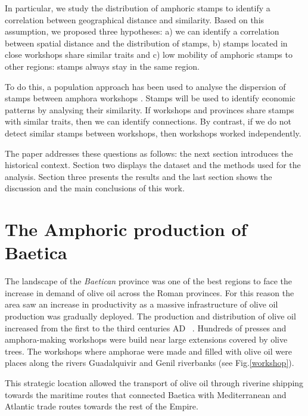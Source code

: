 \documentclass[review]{elsarticle}
\begin{document}
In particular, we study the distribution of amphoric stamps to identify a correlation between geographical distance and similarity. Based on this assumption, we proposed three hypotheses: a) we can identify a correlation between spatial distance and the distribution of stamps, b) stamps located in close workshops share similar traits and c) low mobility of amphoric stamps to other regions: stamps always stay in the same region.  

To do this, a population approach has been used to analyse the dispersion of stamps between amphora workshops \citep{rubio-campillo_ecology_2018}. Stamps will be used to identify economic patterns by analysing their similarity. If workshops and provinces share stamps with similar traits, then we can identify connections. By contrast, if we do not detect similar stamps between workshops, then workshops worked independently. 

The paper addresses these questions as follows: the next section introduces the historical context. Section two displays the dataset and the methods used for the analysis. Section three presents the results and the last section shows the discussion and the main conclusions of this work. 


\section{The Amphoric production of Baetica}

The landscape of the \textit{Baetican} province was one of the best regions to face the increase in demand of olive oil across the Roman provinces. For this reason the area saw an increase in productivity as a massive infrastructure of olive oil production was gradually deployed. The production and distribution of olive oil increased from the first to the third centuries AD ~\citep{remesal_concierto}. Hundreds of presses and amphora-making workshops were build near large extensions covered by olive trees. The workshops where amphorae were made and filled with olive oil were places along the rivers Guadalquivir and Genil riverbanks (see Fig.\ref{workshop}).

This strategic location allowed the transport of olive oil through riverine shipping towards the maritime routes that connected Baetica with Mediterranean and Atlantic trade routes towards the rest of the Empire\citep{garcia_vargas_enrique_formal_2010}.
\end{document}
